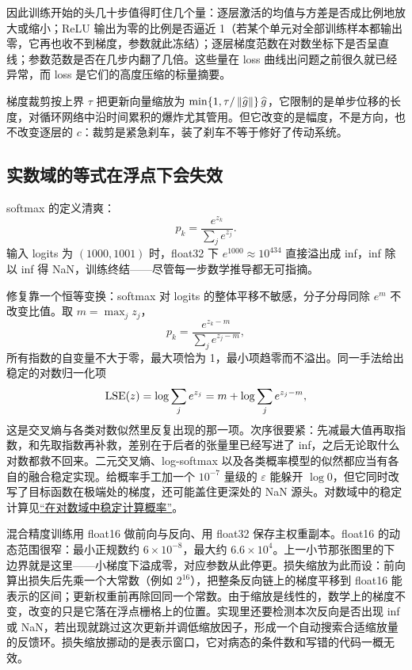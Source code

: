 因此训练开始的头几十步值得盯住几个量：逐层激活的均值与方差是否成比例地放大或缩小；ReLU 输出为零的比例是否逼近 1（若某个单元对全部训练样本都输出零，它再也收不到梯度，参数就此冻结）；逐层梯度范数在对数坐标下是否呈直线；参数范数是否在几步内翻了几倍。这些量在 loss 曲线出问题之前很久就已经异常，而 loss 是它们的高度压缩的标量摘要。

梯度裁剪按上界 \(\tau\) 把更新向量缩放为 \(\min\{1,\tau/\left\lVert\widehat g\right\rVert\}\,\widehat g\)，它限制的是单步位移的长度，对循环网络中沿时间累积的爆炸尤其管用。但它改变的是幅度，不是方向，也不改变逐层的 \(c\)：裁剪是紧急刹车，装了刹车不等于修好了传动系统。

\subsection{实数域的等式在浮点下会失效}

softmax 的定义清爽：
\[
p_k=\frac{e^{z_k}}{\sum_j e^{z_j}}.
\]
输入 logits 为 \((1000,1001)\) 时，float32 下 \(e^{1000}\approx10^{434}\) 直接溢出成 inf，inf 除以 inf 得 NaN，训练终结——尽管每一步数学推导都无可指摘。

修复靠一个恒等变换：softmax 对 logits 的整体平移不敏感，分子分母同除 \(e^m\) 不改变比值。取 \(m=\max_j z_j\)，
\[
p_k=\frac{e^{z_k-m}}{\sum_j e^{z_j-m}},
\]
所有指数的自变量不大于零，最大项恰为 1，最小项趋零而不溢出。同一手法给出稳定的对数归一化项
\[
\operatorname{LSE}(z)=\log\sum_j e^{z_j}=m+\log\sum_j e^{z_j-m},
\]
这是交叉熵与各类对数似然里反复出现的那一项。次序很要紧：先减最大值再取指数，和先取指数再补救，差别在于后者的张量里已经写进了 inf，之后无论取什么对数都救不回来。二元交叉熵、log-softmax 以及各类概率模型的似然都应当有各自的融合稳定实现。给概率手工加一个 \(10^{-7}\) 量级的 \(\varepsilon\) 能躲开 \(\log 0\)，但它同时改写了目标函数在极端处的梯度，还可能盖住更深处的 NaN 源头。对数域中的稳定计算见\hyperref[sec:08-Numerical-Analysis/07-Numerical-Methods-for-ML/01]{``在对数域中稳定计算概率''}。

混合精度训练用 float16 做前向与反向、用 float32 保存主权重副本。float16 的动态范围很窄：最小正规数约 \(6\times10^{-8}\)，最大约 \(6.6\times10^{4}\)。上一小节那张图里的下边界就是这里——小梯度下溢成零，对应参数从此停更。损失缩放为此而设：前向算出损失后先乘一个大常数（例如 \(2^{16}\)），把整条反向链上的梯度平移到 float16 能表示的区间；更新权重前再除回同一个常数。由于缩放是线性的，数学上的梯度不变，改变的只是它落在浮点栅格上的位置。实现里还要检测本次反向是否出现 inf 或 NaN，若出现就跳过这次更新并调低缩放因子，形成一个自动搜索合适缩放量的反馈环。损失缩放挪动的是表示窗口，它对病态的条件数和写错的代码一概无效。

